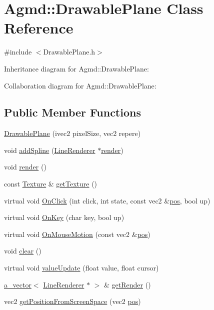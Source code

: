 \hypertarget{class_agmd_1_1_drawable_plane}{\section{Agmd\+:\+:Drawable\+Plane Class Reference}
\label{class_agmd_1_1_drawable_plane}
}


{\ttfamily \#include $<$Drawable\+Plane.\+h$>$}



Inheritance diagram for Agmd\+:\+:Drawable\+Plane\+:


Collaboration diagram for Agmd\+:\+:Drawable\+Plane\+:
\subsection*{Public Member Functions}
\begin{DoxyCompactItemize}
\item 
\hyperlink{class_agmd_1_1_drawable_plane_a880fc03ecbf702687fbc1f49eadbb36a}{Drawable\+Plane} (ivec2 pixel\+Size, vec2 repere)
\item 
void \hyperlink{class_agmd_1_1_drawable_plane_a2391933443bed5f5ede7b1d3e432a7fe}{add\+Spline} (\hyperlink{class_agmd_1_1_line_renderer}{Line\+Renderer} $\ast$\hyperlink{class_agmd_1_1_drawable_plane_a0b7ad80f3bdb5bc7a38838ecc9f3c9af}{render})
\item 
void \hyperlink{class_agmd_1_1_drawable_plane_a0b7ad80f3bdb5bc7a38838ecc9f3c9af}{render} ()
\item 
const \hyperlink{class_agmd_1_1_texture}{Texture} \& \hyperlink{class_agmd_1_1_drawable_plane_a6d08c87bd7d97ffba48a01e729af7d7f}{get\+Texture} ()
\item 
virtual void \hyperlink{class_agmd_1_1_drawable_plane_afa0378c703f4c6829782b622c03ffdb2}{On\+Click} (int click, int state, const vec2 \&\hyperlink{_examples_2_planet_2_app_8cpp_aa8a1c0491559faca4ebd0881575ae7f0}{pos}, bool up)
\item 
virtual void \hyperlink{class_agmd_1_1_drawable_plane_aac9621336d61d3fc92ef84ff6cf339df}{On\+Key} (char key, bool up)
\item 
virtual void \hyperlink{class_agmd_1_1_drawable_plane_a0c6c87999f5252cf3559b31212d32d62}{On\+Mouse\+Motion} (const vec2 \&\hyperlink{_examples_2_planet_2_app_8cpp_aa8a1c0491559faca4ebd0881575ae7f0}{pos})
\item 
void \hyperlink{class_agmd_1_1_drawable_plane_aec667a45b3c0bad09d83162da2619ac9}{clear} ()
\item 
virtual void \hyperlink{class_agmd_1_1_drawable_plane_a4014f7ff890cfc0940755f3628170060}{value\+Update} (float value, float cursor)
\item 
\hyperlink{_vector_8h_a3df82cea60ff4ad0acb44e58454406a5}{a\+\_\+vector}$<$ \hyperlink{class_agmd_1_1_line_renderer}{Line\+Renderer} $\ast$ $>$ \& \hyperlink{class_agmd_1_1_drawable_plane_aa369b21b311bf6c072104dce41513d4c}{get\+Render} ()
\item 
vec2 \hyperlink{class_agmd_1_1_drawable_plane_aa2b3d9098faa673d2e95b05aa0e412a7}{get\+Position\+From\+Screen\+Space} (vec2 \hyperlink{_examples_2_planet_2_app_8cpp_aa8a1c0491559faca4ebd0881575ae7f0}{pos})
\end{DoxyCompactItemize}
